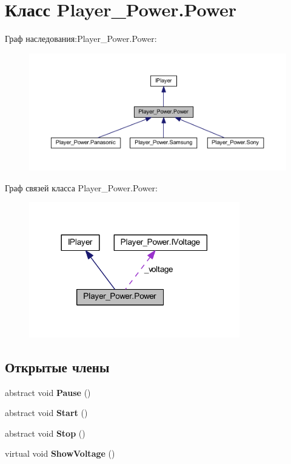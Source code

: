 \section{Класс Player\-\_\-\-Power.\-Power}
\label{class_player___power_1_1_power}


Граф наследования\-:Player\-\_\-\-Power.\-Power\-:
\nopagebreak
\begin{figure}[H]
\begin{center}
\leavevmode
\includegraphics[width=350pt]{class_player___power_1_1_power__inherit__graph}
\end{center}
\end{figure}


Граф связей класса Player\-\_\-\-Power.\-Power\-:
\nopagebreak
\begin{figure}[H]
\begin{center}
\leavevmode
\includegraphics[width=260pt]{class_player___power_1_1_power__coll__graph}
\end{center}
\end{figure}
\subsection*{Открытые члены}
\begin{DoxyCompactItemize}
\item 
abstract void {\bfseries Pause} ()\label{class_player___power_1_1_power_a3c130b04215027dde6380b8cc43b8331}

\item 
abstract void {\bfseries Start} ()\label{class_player___power_1_1_power_a136fcc3925c43b987ba5ecc13fee498b}

\item 
abstract void {\bfseries Stop} ()\label{class_player___power_1_1_power_a0df6e9fbbad3f2647257568d6d190e4c}

\item 
virtual void {\bfseries Show\-Voltage} ()\label{class_player___power_1_1_power_a7c930922908710572baf5a04122b4a09}

\end{DoxyCompactItemize}
